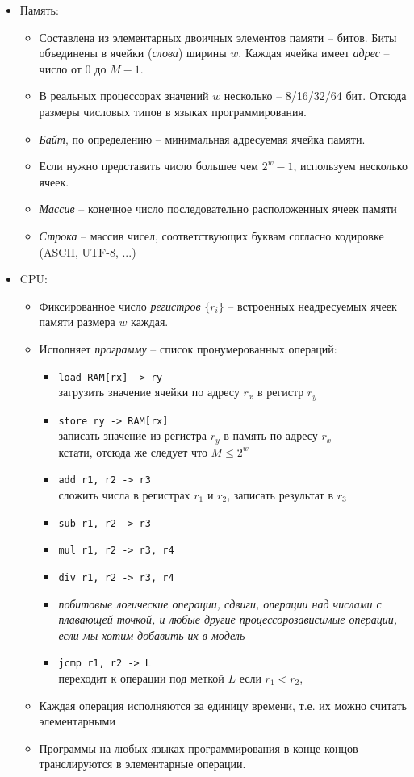 \documentclass[12pt,a4paper]{report}
\begin{document}
\begin{itemize}
	\item Память: 
	\begin{itemize}
		\item Составлена из элементарных двоичных элементов памяти -- битов. Биты объединены в ячейки ({\em слова}) ширины $w$. Каждая ячейка имеет {\em адрес} -- число от $0$ до $M-1$.
		\item В реальных процессорах значений $w$ несколько -- 8/16/32/64 бит. Отсюда размеры числовых типов в языках программирования.
		\item {\em Байт}, по определению -- минимальная адресуемая ячейка памяти.
		\item Если нужно представить число большее чем $2^w-1$, используем несколько ячеек.
		\item {\em Массив} -- конечное число последовательно расположенных ячеек памяти
		\item {\em Строка} -- массив чисел, соответствующих буквам согласно кодировке (ASCII, UTF-8, ...)
	\end{itemize}
	\item CPU: 
	\begin{itemize}
		\item Фиксированное число {\em регистров} $\{r_i\}$ -- встроенных неадресуемых ячеек памяти размера $w$ каждая.
		\item Исполняет {\em программу} -- список пронумерованных операций:
		\begin{itemize}
			\item {\tt load RAM[rx] -> ry}\\
				  загрузить значение ячейки по адресу $r_x$ в регистр $r_y$
			\item {\tt store ry -> RAM[rx]}\\
			      записать значение из регистра $r_y$ в память по адресу $r_x$\\
			      кстати, отсюда же следует что $M \leq 2^w$
			\item {\tt add r1, r2 -> r3}\\
				  сложить числа в регистрах $r_1$ и $r_2$, записать результат в $r_3$
			\item {\tt sub r1, r2 -> r3}
			\item {\tt mul r1, r2 -> r3, r4}
			\item {\tt div r1, r2 -> r3, r4}
			\item {\em побитовые логические операции, сдвиги, операции над числами с плавающей точкой, и любые другие процессорозависимые операции, если мы хотим добавить их в модель}
			\item {\tt jcmp r1, r2 -> L}\\
				  переходит к операции под меткой $L$ если $r_1 < r_2$,
		\end{itemize}
		\item Каждая операция исполняются за единицу времени, т.е. их можно считать элементарными
		\item Программы на любых языках программирования в конце концов транслируются в элементарные операции.
	\end{itemize}
\end{itemize}
\end{document}
